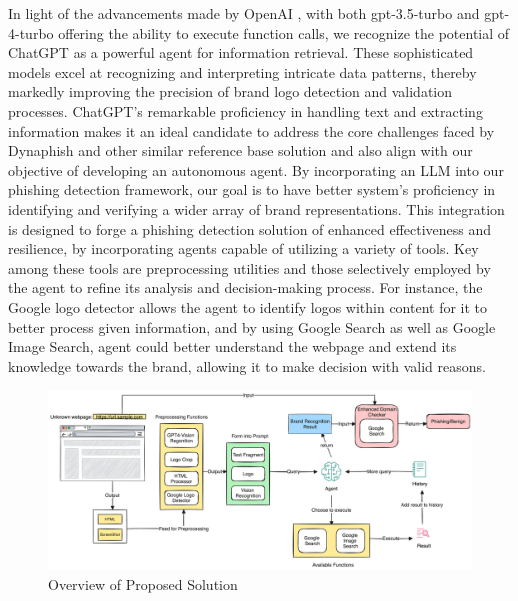 In light of the advancements made by OpenAI \cite{openai2023gpt}, with both gpt-3.5-turbo and gpt-4-turbo offering the ability to execute function calls, we recognize the potential of ChatGPT as a powerful agent for information retrieval. These sophisticated models excel at recognizing and interpreting intricate data patterns, thereby markedly improving the precision of brand logo detection and validation processes. ChatGPT's remarkable proficiency in handling text and extracting information makes it an ideal candidate to address the core challenges faced by Dynaphish and other similar reference base solution and also align with our objective of developing an autonomous agent. By incorporating an LLM into our phishing detection framework, our goal is to have better system's proficiency in identifying and verifying a wider array of brand representations. This integration is designed to forge a phishing detection solution of enhanced effectiveness and resilience, by incorporating agents capable of utilizing a variety of tools. Key among these tools are preprocessing utilities and those selectively employed by the agent to refine its analysis and decision-making process. For instance, the Google logo detector allows the agent to identify logos within content for it to better process given information, and by using Google Search as well as Google Image Search, agent could better understand the webpage and extend its knowledge towards the brand, allowing it to make decision with valid reasons.



\begin{figure}[H]
\caption{Overview of Proposed Solution}
\centering
\includegraphics[width=1\textwidth]{images/updated_diagram.png}
\end{figure}

